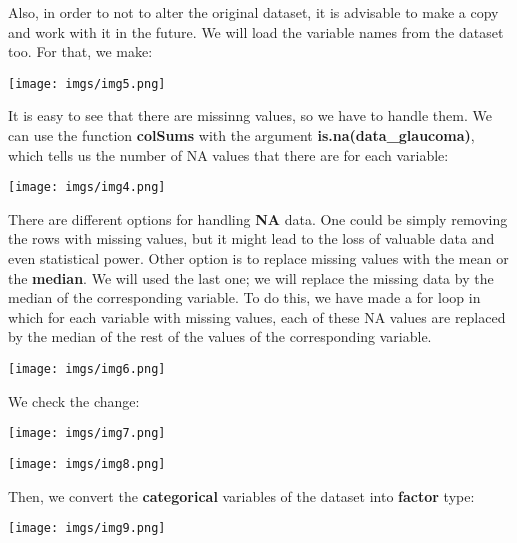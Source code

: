 \documentclass{article}
\begin{document}
Also, in order to not to alter the original dataset, it is advisable to make a copy and work with it in the
future. We will load the variable names from the dataset too. For that, we make:

\begin{center}
    {\texttt{[image: imgs/img5.png]}\par}
\end{center}

It is easy to see that there are missinng values, so we have to handle them. We can use the 
function \textbf{colSums} with the argument \textbf{is.na(data\_glaucoma)}, which tells us the number of
NA values that there are for each variable:

\begin{center}
    {\texttt{[image: imgs/img4.png]}\par}
\end{center}


There are different options for handling \textbf{NA} data. One could be simply removing the rows with missing values, but
it might lead to the loss of valuable data and even statistical power. Other option is to replace missing values
with the mean or the \textbf{median}. We will used the last one; we will replace the missing data by the median of the
corresponding variable. To do this, we have made a for loop in which for each variable with missing values, each of
these NA values are replaced by the median of the rest of the values of the corresponding variable. 

\begin{center}
    {\texttt{[image: imgs/img6.png]}\par}
\end{center}

We check the change:

\begin{center}
    {\texttt{[image: imgs/img7.png]}\par}

    {\texttt{[image: imgs/img8.png]}\par}
\end{center}


Then, we convert the \textbf{categorical} variables of the dataset into \textbf{factor} type:

\begin{center}
    {\texttt{[image: imgs/img9.png]}\par}
\end{center}
\end{document}
